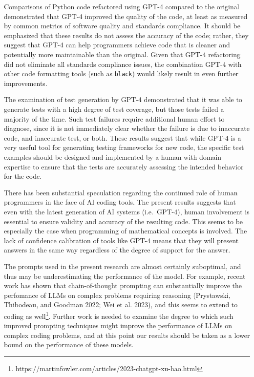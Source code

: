 \documentclass[
]{article}
\begin{document}
Comparisons of Python code refactored using GPT-4 compared to the
original demonstrated that GPT-4 improved the quality of the code, at
least as measured by common metrics of software quality and standards
compliance. It should be emphasized that these results do not assess the
accuracy of the code; rather, they suggest that GPT-4 can help
programmers achieve code that is cleaner and potentially more
maintainable than the original. Given that GPT-4 refactoring did not
eliminate all standards compliance issues, the combination GPT-4 with
other code formatting tools (such as \texttt{black}) would likely result
in even further improvements.

The examination of test generation by GPT-4 demonstrated that it was
able to generate tests with a high degree of test coverage, but those
tests failed a majority of the time. Such test failures require
additional human effort to diagnose, since it is not immediately clear
whether the failure is due to inaccurate code, and inaccurate test, or
both. These results suggest that while GPT-4 is a very useful tool for
generating testing frameworks for new code, the specific test examples
should be designed and implemented by a human with domain expertise to
ensure that the tests are accurately assessing the intended behavior for
the code.

There has been substantial speculation regarding the continued role of
human programmers in the face of AI coding tools. The present results
suggests that even with the latest generation of AI systems
(i.e.~GPT-4), human involvement is essential to ensure validity and
accuracy of the resulting code. This seems to be especially the case
when programming of mathematical concepts is involved. The lack of
confidence calibration of tools like GPT-4 means that they will present
answers in the same way regardless of the degree of support for the
answer.

The prompts used in the present research are almost certainly
suboptimal, and thus may be underestimating the performance of the
model. For example, recent work has shown that chain-of-thought
prompting can substantially improve the perfomance of LLMs on complex
problems requiring reasoning (Prystawski, Thibodeau, and Goodman 2022;
Wei et al. 2023), and this seems to extend to coding as well\footnote{https://martinfowler.com/articles/2023-chatgpt-xu-hao.html}.
Further work is needed to examine the degree to which such improved
prompting techniques might improve the performance of LLMs on complex
coding problems, and at this point our results should be taken as a
lower bound on the performance of these models.
\end{document}
